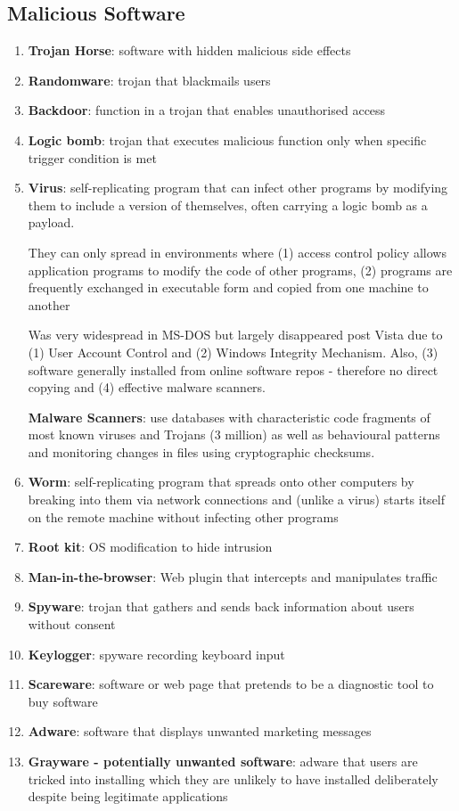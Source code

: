 \documentclass{article}
\begin{document}
\subsection{Malicious Software}
\begin{enumerate}
	\item \textbf{Trojan Horse}: software with hidden malicious side effects
	\item \textbf{Randomware}: trojan that blackmails users
	\item \textbf{Backdoor}: function in a trojan that enables unauthorised access
	\item \textbf{Logic bomb}: trojan that executes malicious function only when specific trigger condition is met
	\item \textbf{Virus}: self-replicating program that can infect other programs by modifying them to include a version of themselves, often carrying a logic bomb as a payload.
	
	\bigskip
	They can only spread in environments where (1) access control policy allows application programs to modify the code of other programs, (2) programs are frequently exchanged in executable form and copied from one machine to another
	
	Was very widespread in MS-DOS but largely disappeared post Vista due to (1) User Account Control and (2) Windows Integrity Mechanism. Also, (3) software generally installed from online software repos - therefore no direct copying and (4) effective malware scanners.
	
	\bigskip
	\noindent
	\textbf{Malware Scanners}: use databases with characteristic code fragments of most known viruses and Trojans (3 million) as well as behavioural patterns and monitoring changes in files using cryptographic checksums.
	
	\item \textbf{Worm}: self-replicating program that spreads onto other computers by breaking into them via network connections and (unlike a virus) starts itself on the remote machine without infecting other programs
	\item \textbf{Root kit}: OS modification to hide intrusion
	\item \textbf{Man-in-the-browser}: Web plugin that intercepts and manipulates traffic
	\item \textbf{Spyware}: trojan that gathers and sends back information about users without consent
	\item \textbf{Keylogger}: spyware recording keyboard input
	\item \textbf{Scareware}: software or web page that pretends to be a diagnostic tool to buy software
	\item \textbf{Adware}: software that displays unwanted marketing messages
	\item \textbf{Grayware - potentially unwanted software}: adware that users are tricked into installing which they are unlikely to have installed deliberately despite being legitimate applications
\end{enumerate}
\end{document}
